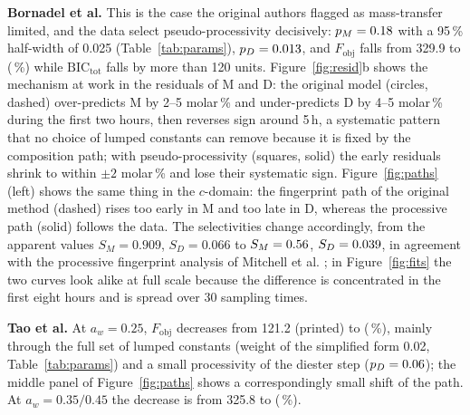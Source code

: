 \textbf{Bornadel et al.} This is the case the original authors flagged as mass-transfer limited, and the data select pseudo-processivity decisively: $p_M=0.18$ with a 95\,\% half-width of 0.025 (Table~\ref{tab:params}), $p_D=0.013$, and $F_\mathrm{obj}$ falls from 329.9 to \InBornFnew{} (\InBornRed\,\%) while $\mathrm{BIC}_\mathrm{tot}$ falls by more than 120 units. Figure~\ref{fig:resid}b shows the mechanism at work in the residuals of M and D: the original model (circles, dashed) over-predicts M by 2--5 molar\,\% and under-predicts D by 4--5 molar\,\% during the first two hours, then reverses sign around 5\,h, a systematic pattern that no choice of lumped constants can remove because it is fixed by the composition path; with pseudo-processivity (squares, solid) the early residuals shrink to within $\pm2$ molar\,\% and lose their systematic sign. Figure~\ref{fig:paths} (left) shows the same thing in the $c$-domain: the fingerprint path of the original method (dashed) rises too early in M and too late in D, whereas the processive path (solid) follows the data. The selectivities change accordingly, from the apparent values $S_M=0.909$, $S_D=0.066$ to $S_M=0.56$, $S_D=0.039$, in agreement with the processive fingerprint analysis of Mitchell et al. \cite{mitchell2023}; in Figure~\ref{fig:fits} the two curves look alike at full scale because the difference is concentrated in the first eight hours and is spread over 30 sampling times.

\textbf{Tao et al.} At $a_w=0.25$, $F_\mathrm{obj}$ decreases from 121.2 (printed) to \InTaoAFnew{} (\InTaoARed\,\%), mainly through the full set of lumped constants (weight of the simplified form 0.02, Table~\ref{tab:params}) and a small processivity of the diester step ($p_D=0.06$); the middle panel of Figure~\ref{fig:paths} shows a correspondingly small shift of the path. At $a_w=0.35/0.45$ the decrease is from 325.8 to \InTaoBFnew{} (\InTaoBRed\,\%).

